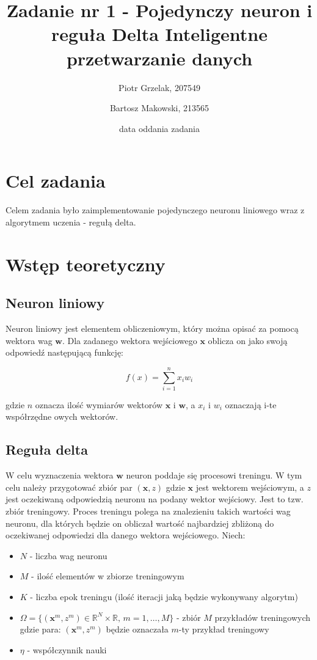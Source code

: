 \documentclass[12pt]{article}
\title{{\bf Zadanie nr 1 - Pojedynczy neuron i reguła Delta}\linebreak
Inteligentne przetwarzanie danych}
\author{Piotr Grzelak, 207549 \and Bartosz Makowski, 213565}
\date{data oddania zadania}
\begin{document}
\clearpage\maketitle
\thispagestyle{empty}
\newpage
\setcounter{page}{1}
\section{Cel zadania}

Celem zadania było zaimplementowanie pojedynczego neuronu liniowego wraz z algorytmem uczenia - regułą delta.

\section{Wstęp teoretyczny}

\subsection{Neuron liniowy}

Neuron liniowy jest elementem obliczeniowym, który można opisać za pomocą wektora wag $\textbf{w}$. Dla zadanego wektora wejściowego $\textbf{x}$ oblicza on jako swoją odpowiedź następującą funkcję:

\[ f(x) = \sum_{i=1}^n x_i w_i \]

gdzie $n$ oznacza ilość wymiarów wektorów $\textbf{x}$ i $\textbf{w}$, a $x_i$ i $w_i$ oznaczają i-te współrzędne owych wektorów.

\subsection{Reguła delta}

W celu wyznaczenia wektora $\textbf{w}$ neuron poddaje się procesowi treningu. W tym celu należy przygotować zbiór par $(\textbf{x}, z)$ gdzie $\textbf{x}$ jest wektorem wejściowym, a $z$ jest oczekiwaną odpowiedzią neuronu na podany wektor wejściowy. Jest to tzw. zbiór treningowy. Proces treningu polega na znalezieniu takich wartości wag neuronu, dla których będzie on obliczał wartość najbardziej zbliżoną do oczekiwanej odpowiedzi dla danego wektora wejściowego. Niech:

\begin{itemize}
\item $N$ - liczba wag neuronu
\item $M$ - ilość elementów w zbiorze treningowym
\item $K$ - liczba epok treningu (ilość iteracji jaką będzie wykonywany algorytm)
\item $\Omega=\lbrace(\textbf{x}^m, z^m) \in \mathbb{R}^N \times \mathbb{R}, \, m=1, \ldots , M \rbrace$ - zbiór $M$ przykładów treningowych gdzie para: $(\textbf{x}^m, z^m)$ będzie oznaczała $m$-ty przykład treningowy
\item $\eta$ - współczynnik nauki
\end{itemize}
\end{document}
